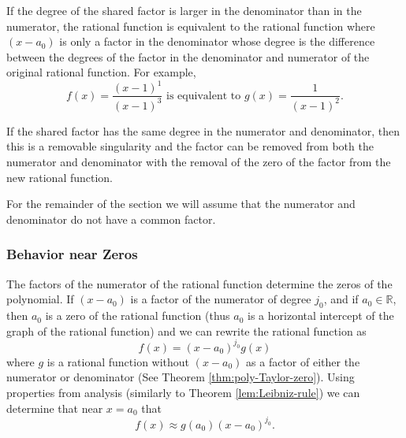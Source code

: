 \documentclass[
]{book}
\theoremstyle{definition}
\theoremstyle{definition}
\theoremstyle{definition}
\theoremstyle{remark}
\begin{document}
If the degree of the shared factor is larger in the denominator than in the numerator, the rational function is equivalent to the rational function where \((x-a_0)\) is only a factor in the denominator whose degree is the difference between the degrees of the factor in the denominator and numerator of the original rational function.
For example,
\[f(x)=\frac{(x-1)^1}{(x-1)^3} \mbox{ is equivalent to } g(x)=\frac{1}{(x-1)^2}.\]

If the shared factor has the same degree in the numerator and denominator, then this is a removable singularity and the factor can be removed from both the numerator and denominator with the removal of the zero of the factor from the new rational function.

For the remainder of the section we will assume that the numerator and denominator do not have a common factor.

\hypertarget{behavior-near-zeros}{%
\subsubsection{Behavior near Zeros}\label{behavior-near-zeros}}

The factors of the numerator of the rational function determine the zeros of the polynomial. If \((x-a_0)\) is a factor of the numerator of degree \(j_0\), and if \(a_0\in \mathbb{R}\), then \(a_0\) is a zero of the rational function (thus \(a_0\) is a horizontal intercept of the graph of the rational function) and we can rewrite the rational function as
\[f(x) = (x-a_0)^{j_0} g(x)\] where \(g\) is a rational function without \((x-a_0)\) as a factor of either the numerator or denominator (See Theorem \ref{thm:poly-Taylor-zero}). Using properties from analysis (similarly to Theorem \ref{lem:Leibniz-rule}) we can determine that near \(x=a_0\) that
\[f(x) \approx g(a_0) (x-a_0)^{j_0}.\]
\end{document}
